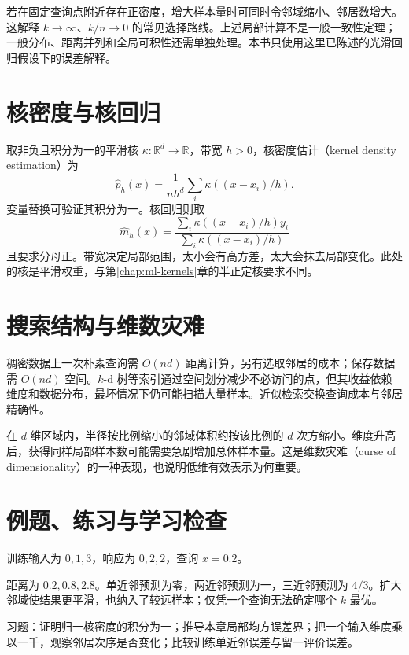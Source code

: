若在固定查询点附近存在正密度，增大样本量时可同时令邻域缩小、邻居数增大。这解释 $k\to\infty$、$k/n\to0$ 的常见选择路线。上述局部计算不是一般一致性定理；一般分布、距离并列和全局可积性还需单独处理。本书只使用这里已陈述的光滑回归假设下的误差解释。

\section{核密度与核回归}

取非负且积分为一的平滑核 $\kappa:\mathbb R^d\to\mathbb R$，带宽 $h>0$，核密度估计（kernel density estimation）为
\begin{equation}
 \widehat p_h(x)=\frac1{nh^d}\sum_i\kappa((x-x_i)/h).
 \label{eq:ml-kde}
\end{equation}
变量替换可验证其积分为一。核回归则取
\[
 \widehat m_h(x)=
 \frac{\sum_i\kappa((x-x_i)/h)y_i}{\sum_i\kappa((x-x_i)/h)}
\]
且要求分母正。带宽决定局部范围，太小会有高方差，太大会抹去局部变化。此处的核是平滑权重，与第\ref{chap:ml-kernels}章的半正定核要求不同。

\section{搜索结构与维数灾难}

稠密数据上一次朴素查询需 $O(nd)$ 距离计算，另有选取邻居的成本；保存数据需 $O(nd)$ 空间。$k$-d 树等索引通过空间划分减少不必访问的点，但其收益依赖维度和数据分布，最坏情况下仍可能扫描大量样本。近似检索交换查询成本与邻居精确性。

在 $d$ 维区域内，半径按比例缩小的邻域体积约按该比例的 $d$ 次方缩小。维度升高后，获得同样局部样本数可能需要急剧增加总体样本量。这是维数灾难（curse of dimensionality）的一种表现，也说明低维有效表示为何重要。

\section{例题、练习与学习检查}

\begin{example}[邻居数量的影响]
训练输入为 $0,1,3$，响应为 $0,2,2$，查询 $x=0.2$。
\end{example}
\begin{solve}
距离为 $0.2,0.8,2.8$。单近邻预测为零，两近邻预测为一，三近邻预测为 $4/3$。扩大邻域使结果更平滑，也纳入了较远样本；仅凭一个查询无法确定哪个 $k$ 最优。
\end{solve}

习题：证明归一核密度的积分为一；推导本章局部均方误差界；把一个输入维度乘以一千，观察邻居次序是否变化；比较训练单近邻误差与留一评价误差。





